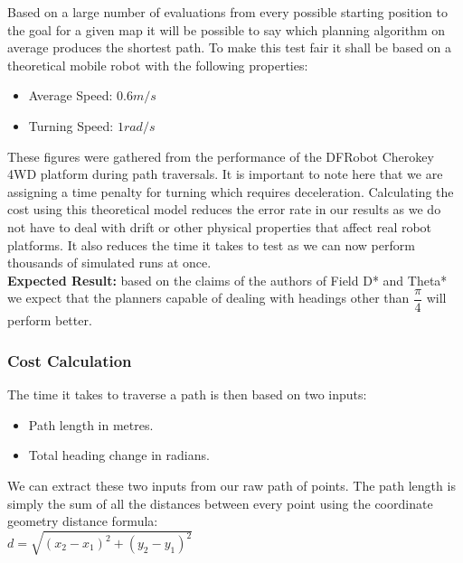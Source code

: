 \noindent
Based on a large number of evaluations from every possible starting position to the goal for a given map it will be possible to say which planning algorithm on average produces the shortest path. To make this test fair it shall be based on a theoretical mobile robot with the following properties: 

\begin{itemize}
\item Average Speed: $0.6m/s$
\item Turning Speed: $1rad/s$ 
\end{itemize} 

\noindent
These figures were gathered from the performance of the DFRobot Cherokey 4WD platform during path traversals. It is important to note here that we are assigning a time penalty for turning which requires deceleration. Calculating the cost using this theoretical model reduces the error rate in our results as we do not have to deal with drift or other physical properties that affect real robot platforms. It also reduces the time it takes to test as we can now perform thousands of simulated runs at once. \\

\noindent
\textbf{Expected Result:} based on the claims of the authors of Field D* and Theta* we expect that the planners capable of dealing with headings other than $\dfrac{\pi}{4}$ will perform better.

\newpage

\subsubsection{Cost Calculation}

\noindent
The time it takes to traverse a path is then based on two inputs:

\begin{itemize}
\item Path length in metres.
\item Total heading change in radians.
\end{itemize}

\noindent
We can extract these two inputs from our raw path of points. The path length is simply the sum of all the distances between every point using the coordinate geometry distance formula: \\

\indent $d = \sqrt{(x_{2} - x_{1})^{2} + (y_{2} - y_{1})^{2}}$ \\

